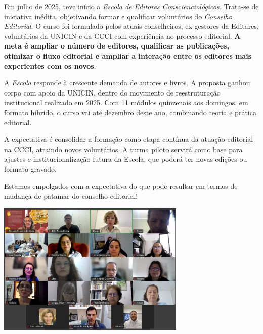 \documentclass{gescons}
\begin{document}
    \begin{multicols}{2}


Em julho de 2025, teve início a \emph{Escola de Editores Conscienciológicos.} Trata-se de iniciativa inédita, objetivando formar e qualificar voluntários do \emph{Conselho Editorial}. O curso foi formulado pelos atuais conselheiros, ex-gestores da Editares, voluntários da UNICIN e da CCCI com experiência no processo editorial. \textbf{A meta é ampliar o número de editores, qualificar as publicações, otimizar o fluxo editorial e ampliar a interação entre os editores mais experientes com os novos}.

A \emph{Escola} responde à crescente demanda de autores e livros. A proposta ganhou corpo com apoio da UNICIN, dentro do movimento de reestruturação institucional realizado em 2025. Com 11 módulos quinzenais aos domingos, em formato híbrido, o curso vai até dezembro deste ano, combinando teoria e prática editorial.

A expectativa é consolidar a formação como etapa contínua da atuação editorial na CCCI, atraindo novos voluntários. A turma piloto servirá como base para ajustes e institucionalização futura da Escola, que poderá ter novas edições ou formato gravado.

Estamos empolgados com a expectativa do que pode resultar em termos de mudança de patamar do conselho editorial!


\begin{center}
    \includegraphics[width=9cm]{articles/atualizacoes/fotos/escola-editores/escola-editores1.jpeg} 
\end{center}


    \end{multicols}
\end{document}
